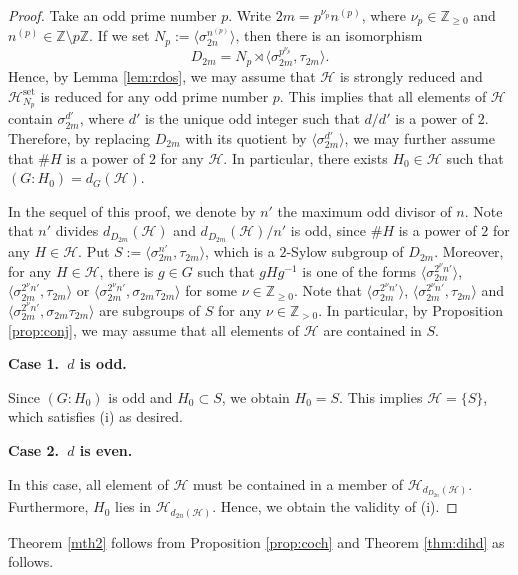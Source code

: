 \documentclass[12pt]{amsart}
\theoremstyle{plain}
\theoremstyle{definition}
\numberwithin{thm}{section}
\numberwithin{equation}{section}
\newcommand{\Zpn}{\mathbb{Z}_{>0}}
\newcommand{\Znn}{\mathbb{Z}_{\geq 0}}
\newcommand{\Z}{\mathbb{Z}}
\newcommand{\cH}{\mathcal{H}}
\DeclareMathOperator{\set}{set}
\begin{document}
\begin{proof}
Take an odd prime number $p$. Write $2m=p^{\nu_{p}}n^{(p)}$, where $\nu_{p}\in \Znn$ and $n^{(p)}\in \Z \setminus p\Z$. If we set $N_{p}:=\langle \sigma_{2n}^{n^{(p)}}\rangle$, then there is an isomorphism 
\begin{equation*}
D_{2m}=N_{p} \rtimes \langle \sigma_{2m}^{p^{\nu_{p}}},\tau_{2m} \rangle. 
\end{equation*}
Hence, by Lemma \ref{lem:rdos}, we may assume that $\cH$ is strongly reduced and $\cH_{N_{p}}^{\set}$ is reduced for any odd prime number $p$. This implies that all elements of $\cH$ contain $\sigma_{2m}^{d'}$, where $d'$ is the unique odd integer such that $d/d'$ is a power of $2$. Therefore, by replacing $D_{2m}$ with its quotient by $\langle \sigma_{2m}^{d'}\rangle$, we may further assume that $\#H$ is a power of $2$ for any $\cH$. In particular, there exists $H_{0}\in \cH$ such that $(G:H_{0})=d_{G}(\cH)$.

In the sequel of this proof, we denote by $n'$ the maximum odd divisor of $n$. Note that $n'$ divides $d_{D_{2m}}(\cH)$ and $d_{D_{2m}}(\cH)/n'$ is odd, since $\#H$ is a power of $2$ for any $H\in \cH$. Put $S:=\langle \sigma_{2m}^{n'},\tau_{2m}\rangle$, which is a $2$-Sylow subgroup of $D_{2m}$. Moreover, for any $H\in \cH$, there is $g\in G$ such that $gHg^{-1}$ is one of the forms $\langle \sigma_{2m}^{2^{\nu}n'}\rangle$, $\langle \sigma_{2m}^{2^{\nu}n'},\tau_{2m}\rangle$ or $\langle \sigma_{2m}^{2^{\nu}n'},\sigma_{2m}\tau_{2m}\rangle$ for some $\nu\in \Znn$. Note that $\langle \sigma_{2m}^{2^{\nu}n'}\rangle$, $\langle \sigma_{2m}^{2^{\nu}n'},\tau_{2m}\rangle$ and $\langle \sigma_{2m}^{2^{\nu}n'},\sigma_{2m}\tau_{2m}\rangle$ are subgroups of $S$ for any $\nu \in \Zpn$. In particular, by Proposition \ref{prop:conj}, we may assume that all elements of $\cH$ are contained in $S$. 

\textbf{Case 1.~$d$ is odd. }

Since $(G:H_{0})$ is odd and $H_{0}\subset S$, we obtain $H_{0}=S$. This implies $\cH=\{S\}$, which satisfies (i) as desired. 

\textbf{Case 2.~$d$ is even. }

In this case, all element of $\cH$ must be contained in a member of $\cH_{d_{D_{2n}}(\cH)}$. Furthermore, $H_{0}$ lies in $\cH_{d_{2n}(\cH)}$. Hence, we obtain the validity of (i). 
\end{proof}

Theorem \ref{mth2} follows from Proposition \ref{prop:coch} and Theorem \ref{thm:dihd} as follows. 
\end{document}
